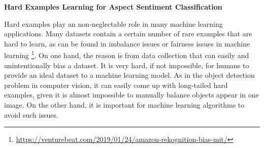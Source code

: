 \textbf{Hard Examples Learning for Aspect Sentiment Classification}

Hard examples play an non-neglectable role in many machine learning applications.
Many datasets contain a certain number of rare examples that are hard to learn, as can be found in imbalance issues or fairness issues in machine learning \footnote{\url{https://venturebeat.com/2019/01/24/amazon-rekognition-bias-mit/}}.
On one hand, the reason is from data collection that can easily and unintentionally bias a dataset.
It is very hard, if not impossible, for humans to provide an ideal dataset to a machine learning model.
As in the object detection problem \cite{shrivastava2016training,lin2017focal} in computer vision, it can easily come up with long-tailed hard examples, given it is almost impossible to manually balance objects appear in one image.
On the other hand, it is important for machine learning algorithms to avoid such issues. 

